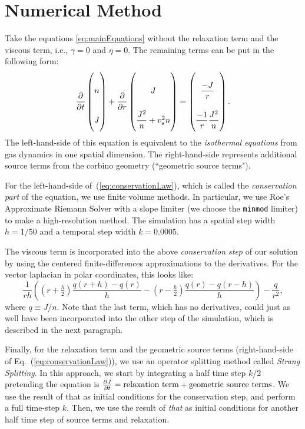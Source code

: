 \documentclass[12pt]{article}
\begin{document}
\appendix
\section{Numerical Method}
Take the equations \ref{eq:mainEquations} without the relaxation term and the viscous term, i.e., $\gamma = 0$ and $\eta = 0$.  The remaining terms can be put in the following form:
\begin{equation}
\label{eq:conservationLaw}
\renewcommand\arraystretch{3}
\pdv{t}
\begin{pmatrix}
n \\
J
\end{pmatrix}
+ \pdv{r}
\begin{pmatrix}
J \\
\dfrac{J^2}{n} + v_s^2n
\end{pmatrix}
=
\begin{pmatrix}
\dfrac{-J}{r} \\
\dfrac{-1}{r} \dfrac{J^2}{n}
\end{pmatrix}.
\end{equation}
The left-hand-side of this equation is equivalent to the \textit{isothermal equations} from gas dynamics in one spatial dimension.  The right-hand-side represents additional source terms from the corbino geometry (``geometric source terms").  

For the left-hand-side of~(\ref{eq:conservationLaw}), which is called the \textit{conservation part} of the equation, we use finite volume methods.  In particular, we use Roe's Approximate Riemann Solver with a slope limiter (we choose the \texttt{minmod} limiter) to make a high-resolution method.  The simulation has a spatial step width $h=1/50$ and a temporal step width $k = 0.0005$.

The viscous term is incorporated into the above \textit{conservation step} of our solution by using the centered finite-differences approximations to the derivatives.  For the vector laplacian in polar coordinates, this looks like:
\begin{equation}
\frac{1}{r h} \left( \left(r + \tfrac{h}{2}\right)\frac{q(r+h)-q(r)}{h} - \left(r-\tfrac{h}{2}\right)\frac{q(r)-q(r-h)}{h}  \right) -\frac{q}{r^2},
\end{equation}
where $q \equiv J/n$.  Note that the last term, which has no derivatives, could just as well have been incorporated into the other step of the simulation, which is described in the next paragraph.

Finally, for the relaxation term and the geometric source terms (right-hand-side of Eq.~(\ref{eq:conservationLaw})), we use an operator splitting method called \textit{Strang Splitting}.  In this approach, we start by integrating a half time step $k/2$ pretending the equation is $\pdv{J}{t} =  \text{relaxation term} + \text{geometric source terms}$.  We use the result of that as initial conditions for the conservation step, and perform a full time-step $k$.  Then, we use the result of \textit{that} as initial conditions for another half time step of source terms and relaxation.  
\end{document}
